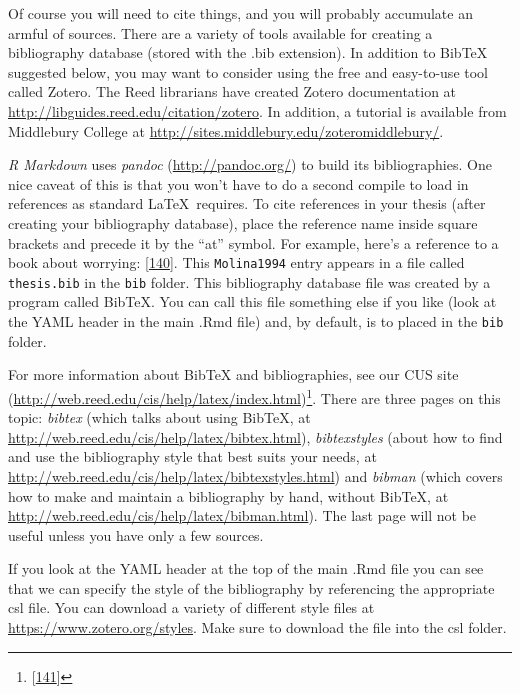 \documentclass[12pt,twoside]{reedthesis}
\begin{document}
  Of course you will need to cite things, and you will probably accumulate
  an armful of sources. There are a variety of tools available for
  creating a bibliography database (stored with the .bib extension). In
  addition to BibTeX suggested below, you may want to consider using the
  free and easy-to-use tool called Zotero. The Reed librarians have
  created Zotero documentation at
  \url{http://libguides.reed.edu/citation/zotero}. In addition, a tutorial
  is available from Middlebury College at
  \url{http://sites.middlebury.edu/zoteromiddlebury/}.
  
  \emph{R Markdown} uses \emph{pandoc} (\url{http://pandoc.org/}) to build
  its bibliographies. One nice caveat of this is that you won't have to do
  a second compile to load in references as standard \LaTeX~requires. To
  cite references in your thesis (after creating your bibliography
  database), place the reference name inside square brackets and precede
  it by the ``at'' symbol. For example, here's a reference to a book about
  worrying: {[}\protect\hyperlink{ref-Molina1994}{140}{]}. This
  \texttt{Molina1994} entry appears in a file called \texttt{thesis.bib}
  in the \texttt{bib} folder. This bibliography database file was created
  by a program called BibTeX. You can call this file something else if you
  like (look at the YAML header in the main .Rmd file) and, by default, is
  to placed in the \texttt{bib} folder.
  
  For more information about BibTeX and bibliographies, see our CUS site
  (\url{http://web.reed.edu/cis/help/latex/index.html})\footnote{{[}\protect\hyperlink{ref-reedweb2007}{141}{]}}.
  There are three pages on this topic: \emph{bibtex} (which talks about
  using BibTeX, at \url{http://web.reed.edu/cis/help/latex/bibtex.html}),
  \emph{bibtexstyles} (about how to find and use the bibliography style
  that best suits your needs, at
  \url{http://web.reed.edu/cis/help/latex/bibtexstyles.html}) and
  \emph{bibman} (which covers how to make and maintain a bibliography by
  hand, without BibTeX, at
  \url{http://web.reed.edu/cis/help/latex/bibman.html}). The last page
  will not be useful unless you have only a few sources.
  
  If you look at the YAML header at the top of the main .Rmd file you can
  see that we can specify the style of the bibliography by referencing the
  appropriate csl file. You can download a variety of different style
  files at \url{https://www.zotero.org/styles}. Make sure to download the
  file into the csl folder.
  
\end{document}
